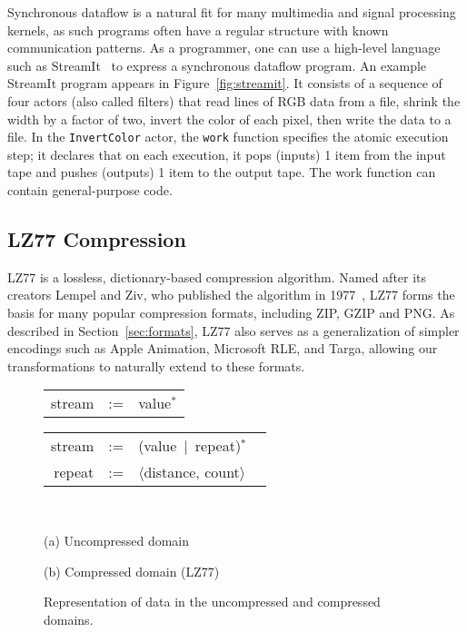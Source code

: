 Synchronous dataflow is a natural fit for many multimedia and signal
processing kernels, as such programs often have a regular structure
with known communication patterns.  As a programmer, one can use a
high-level language such as StreamIt~\cite{streamitcc} to express a
synchronous dataflow program.  An example StreamIt program appears in
Figure~\ref{fig:streamit}.  It consists of a sequence of four actors
(also called filters) that read lines of RGB data from a file,
shrink the width by a factor of two, invert the color of each pixel,
then write the data to a file.  In the {\tt InvertColor} actor, the
{\tt work} function specifies the atomic execution step; it declares
that on each execution, it pops (inputs) 1 item from the input tape
and pushes (outputs) 1 item to the output tape.  The work function can
contain general-purpose code.

\subsection{LZ77 Compression}

LZ77 is a lossless, dictionary-based compression algorithm.  Named
after its creators Lempel and Ziv, who published the algorithm in
1977~\cite{lz77}, LZ77 forms the basis for many popular compression
formats, including ZIP, GZIP and PNG.  As described in
Section~\ref{sec:formats}, LZ77 also serves as a generalization of
simpler encodings such as Apple Animation, Microsoft RLE, and Targa,
allowing our transformations to naturally extend to these formats.

\begin{figure}[t]
\begin{minipage}{1.6in}
\hspace{-5pt}\begin{tabular}{rcl}
stream&\hspace{-9pt}:=&\hspace{-9pt}value$^*$
\end{tabular}
\end{minipage}
\begin{minipage}{1.8in}
\hspace{-5pt}\begin{tabular}{rcl}
stream&\hspace{-9pt}:=&\hspace{-9pt}(value~$|$~repeat)$^*$ ~ \\
repeat&\hspace{-9pt}:=&\hspace{-9pt}$\langle$distance, count$\rangle$
\end{tabular}
\end{minipage} 
~ \\
\begin{minipage}{1.6in}
(a) Uncompressed domain
\end{minipage}
(b) Compressed domain (LZ77)
\caption{Representation of data in the uncompressed and compressed
domains.  \protect\label{fig:domains}}
\end{figure}

